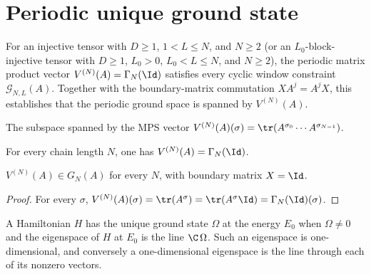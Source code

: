 \section{Periodic unique ground state}\label{sec:periodic_unique_ground_state}

For an injective tensor with $D\ge1$, $1<L\le N$, and $N\ge2$ (or an
$L_0$-block-injective tensor with $D\ge1$, $L_0>0$, $L_0<L\le N$, and $N\ge2$),
the periodic matrix product vector $V^{(N)}(A)=\Gamma_N(\Id)$ satisfies every
cyclic window constraint $\mathcal G_{N,L}(A)$. Together with the
boundary-matrix commutation $X A^j=A^jX$, this establishes that the periodic
ground space is spanned by $V^{(N)}(A)$.

\begin{definition}\label{def:mpv_submodule}
    \leanok
    The subspace spanned by the MPS vector
    $V^{(N)}(A)(\sigma)=\tr(A^{\sigma_0}\cdots A^{\sigma_{N-1}})$.
\end{definition}

\begin{lemma}
    \label{lem:mpv_eq_ground_space_map_one}
    \leanok
    For every chain length $N$, one has $V^{(N)}(A)=\Gamma_N(\Id)$.
\end{lemma}

\begin{lemma}\label{lem:mpv_mem_ground_space}
    \leanok
    $V^{(N)}(A)\in G_N(A)$ for every $N$, with boundary matrix $X=\Id$.
\end{lemma}

\begin{proof}
    \leanok
    For every $\sigma$,
    $V^{(N)}(A)(\sigma)=\tr(A^\sigma)=\tr(A^\sigma\Id)
        =\Gamma_N(\Id)(\sigma)$.
\end{proof}

\begin{definition}\label{def:has_unique_ground_state}
    A Hamiltonian $H$ has the unique ground state $\Omega$ at the energy
    $E_0$ when $\Omega\ne0$ and the eigenspace of $H$ at $E_0$ is the line
    $\C\,\Omega$. Such an eigenspace is one-dimensional, and conversely a
    one-dimensional eigenspace is the line through each of its nonzero
    vectors.
\end{definition}

